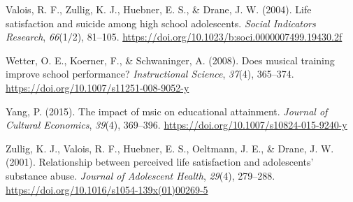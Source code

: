 \documentclass[a4, 12pt]{article}
\begin{document}
\leavevmode\hypertarget{ref-Valois2004}{}%
Valois, R. F., Zullig, K. J., Huebner, E. S., \& Drane, J. W. (2004). Life satisfaction and suicide among high school adolescents. \emph{Social Indicators Research}, \emph{66}(1/2), 81--105. \url{https://doi.org/10.1023/b:soci.0000007499.19430.2f}

\leavevmode\hypertarget{ref-Wetter2008}{}%
Wetter, O. E., Koerner, F., \& Schwaninger, A. (2008). Does musical training improve school performance? \emph{Instructional Science}, \emph{37}(4), 365--374. \url{https://doi.org/10.1007/s11251-008-9052-y}

\leavevmode\hypertarget{ref-Yang2015}{}%
Yang, P. (2015). The impact of msic on educational attainment. \emph{Journal of Cultural Economics}, \emph{39}(4), 369--396. \url{https://doi.org/10.1007/s10824-015-9240-y}

\leavevmode\hypertarget{ref-Zullig2001}{}%
Zullig, K. J., Valois, R. F., Huebner, E. S., Oeltmann, J. E., \& Drane, J. W. (2001). Relationship between perceived life satisfaction and adolescents' substance abuse. \emph{Journal of Adolescent Health}, \emph{29}(4), 279--288. \url{https://doi.org/10.1016/s1054-139x(01)00269-5}

\clearpage

\hypertarget{appendix-appendix}{%
\appendix}
\end{document}
